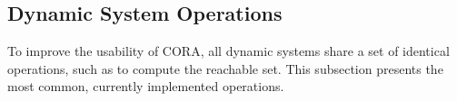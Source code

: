 
\subsection{Dynamic System Operations} \label{sec:dynamicSystemOperations}

To improve the usability of CORA, all dynamic systems share a set of identical operations, such as  to compute the reachable set. This subsection presents the most common, currently implemented operations.











% 












